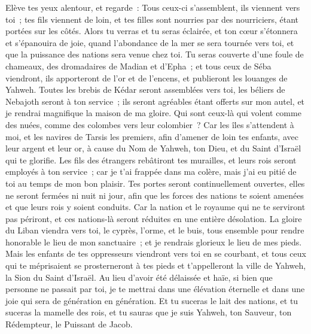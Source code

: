 \begin{multicols}{2}
Elève tes yeux alentour, et regarde~: Tous ceux-ci s'assemblent, ils viennent vers toi~; tes fils viennent de loin, et tes filles sont nourries par des nourriciers, étant portées sur les côtés.
Alors tu verras et tu seras éclairée, et ton cœur s'étonnera et s'épanouira de joie, quand l'abondance de la mer se sera tournée vers toi, et que la puissance des nations sera venue chez toi.
Tu seras couverte d'une foule de chameaux, des dromadaires de Madian et d'Epha~; et tous ceux de Séba viendront, ils apporteront de l'or et de l'encens, et publieront les louanges de Yahweh.
Toutes les brebis de Kédar seront assemblées vers toi, les béliers de Nebajoth seront à ton service~; ils seront agréables étant offerts sur mon autel, et je rendrai magnifique la maison de ma gloire.
Qui sont ceux-là qui volent comme des nuées, comme des colombes vers leur colombier~?
Car les îles s'attendent à moi, et les navires de Tarsis les premiers, afin d'amener de loin tes enfants, avec leur argent et leur or, à cause du Nom de Yahweh, ton Dieu, et du Saint d'Israël qui te glorifie.
Les fils des étrangers rebâtiront tes murailles, et leurs rois seront employés à ton service~; car je t'ai frappée dans ma colère, mais j'ai eu pitié de toi au temps de mon bon plaisir.
Tes portes seront continuellement ouvertes, elles ne seront fermées ni nuit ni jour, afin que les forces des nations te soient amenées et que leurs rois y soient conduits.
Car la nation et le royaume qui ne te serviront pas périront, et ces nations-là seront réduites en une entière désolation.
La gloire du Liban viendra vers toi, le cyprès, l'orme, et le buis, tous ensemble pour rendre honorable le lieu de mon sanctuaire~; et je rendrais glorieux le lieu de mes pieds.
Mais les enfants de tes oppresseurs viendront vers toi en se courbant, et tous ceux qui te méprisaient se prosterneront à tes pieds et t'appelleront la ville de Yahweh, la Sion du Saint d'Israël.
Au lieu d'avoir été délaissée et haïe, si bien que personne ne passait par toi, je te mettrai dans une élévation éternelle et dans une joie qui sera de génération en génération.
Et tu suceras le lait des nations, et tu suceras la mamelle des rois, et tu sauras que je suis Yahweh, ton Sauveur, ton Rédempteur, le Puissant de Jacob.

\end{multicols}
